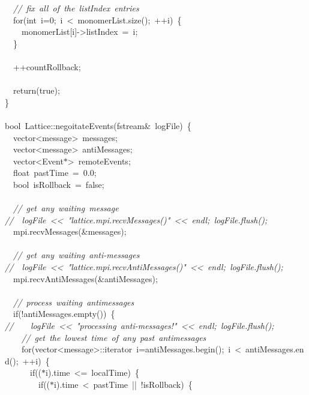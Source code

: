 {\ \ \textsl{//\ fix\ all\ of\ the\ listIndex\ entries}\\
\ \ for(int\ i=0;\ i\ <{}\ monomerList.size();\ ++i)\ \{\\
\ \ \ \ monomerList[i]-{}>{}listIndex\ =\ i;\\
\ \ \}\\
\ \\
\ \ ++countRollback;\\
\ \\
\ \ return(true);\\
\}\\
\ \\
bool\ Lattice::negoitateEvents(fstream\&\ logFile)\ \{\\
\ \ vector<{}message>{}\ messages;\\
\ \ vector<{}message>{}\ antiMessages;\\
\ \ vector<{}Event$\ast$>{}\ remoteEvents;\\
\ \ float\ pastTime\ =\ 0.0;\\
\ \ bool\ isRollback\ =\ false;\\
\ \\
\ \ \textsl{//\ get\ any\ waiting\ message}\\
\textsl{//\ \ logFile\ <{}<{}\ "{}lattice.mpi.recvMessages()"{}\ <{}<{}\ endl;\ logFile.flush();}\\
\ \ mpi.recvMessages(\&messages);\\
\ \\
\ \ \textsl{//\ get\ any\ waiting\ anti-{}messages}\\
\textsl{//\ \ logFile\ <{}<{}\ "{}lattice.mpi.recvAntiMessages()"{}\ <{}<{}\ endl;\ logFile.flush();}\\
\ \ mpi.recvAntiMessages(\&antiMessages);\\
\ \\
\ \ \textsl{//\ process\ waiting\ antimessages}\\
\ \ if(!antiMessages.empty())\ \{\\
\textsl{//\ \ \ \ logFile\ <{}<{}\ "{}processing\ anti-{}messages!"{}\ <{}<{}\ endl;\ logFile.flush();}\\
\ \ \ \ \textsl{//\ get\ the\ lowest\ time\ of\ any\ past\ antimessages}\\
\ \ \ \ for(vector<{}message>{}::iterator\ i=antiMessages.begin();\ i\ <{}\ antiMessages.end();\ ++i)\ \{\\
\ \ \ \ \ \ if(($\ast$i).time\ <{}=\ localTime)\ \{\\
\ \ \ \ \ \ \ \ if(($\ast$i).time\ <{}\ pastTime\ ||\ !isRollback)\ \{\\
}
